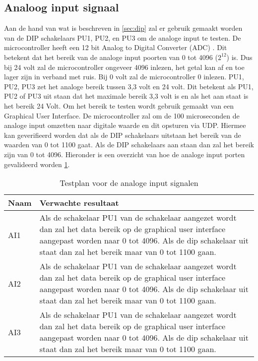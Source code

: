 \subsection{Analoog input signaal}
Aan de hand van wat is beschreven in \ref{sec:dip} zal er gebruik gemaakt worden van de DIP schakelaars PU1, PU2, en PU3 om de analoge input te testen. De microcontroller heeft een 12 bit Analog to Digital Converter (ADC) \autocite{microcontroller}. Dit betekent dat het bereik van de analoge input poorten van 0 tot 4096 ($2^{12}$) is. Dus bij 24 volt zal de microcontroller ongeveer 4096 inlezen, het getal kan af en toe lager zijn in verband met ruis. Bij 0 volt zal de microcontroller 0 inlezen. PU1, PU2, PU3 zet het analoge bereik tussen 3,3 volt en 24 volt. Dit betekent als PU1, PU2 of PU3 uit staan dat het maximale bereik 3,3 volt is en als het aan staat is het bereik 24 Volt. Om het bereik te testen wordt gebruik gemaakt van een Graphical User Interface. De microcontroller zal om de 100 microseconden de analoge input omzetten naar digitale waarde en dit opsturen via UDP. Hiermee kan geverifieerd worden dat als de DIP schakelaars uitstaan het bereik van de waarden van 0 tot 1100 gaat. Als de DIP schakelaars aan staan dan zal het bereik zijn van 0 tot 4096. Hieronder is een overzicht van hoe de analoge input porten gevalideerd worden \ref{tab:hw_val_ai_testplan}.
\begin{table}[h!]
	\caption{Testplan voor de analoge input signalen}
	\begin{tabular}{lp{14.5cm}}
	\toprule
	\textbf{Naam} 	& \textbf{Verwachte resultaat} \\ \toprule
	AI1			& Als de schakelaar PU1 van de schakelaar aangezet wordt dan zal het data bereik op de graphical user interface aangepast worden naar 0 tot 4096. Als de dip schakelaar uit staat dan zal het bereik maar van 0 tot 1100 gaan.\\
	AI2			& Als de schakelaar PU1 van de schakelaar aangezet wordt dan zal het data bereik op de graphical user interface aangepast worden naar 0 tot 4096. Als de dip schakelaar uit staat dan zal het bereik maar van 0 tot 1100 gaan.\\
	AI3			& Als de schakelaar PU1 van de schakelaar aangezet wordt dan zal het data bereik op de graphical user interface aangepast worden naar 0 tot 4096. Als de dip schakelaar uit staat dan zal het bereik maar van 0 tot 1100 gaan.\\  \bottomrule
	\end{tabular}
	\label{tab:hw_val_ai_testplan}
\end{table}

